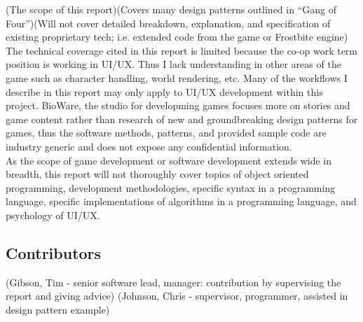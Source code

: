 (The scope of this report)(Covers many design patterns outlined in ``Gang of Four'')(Will not cover detailed breakdown, explanation, and specification of existing proprietary tech; i.e. extended code from the game or Frostbite engine)\bs
\\
The technical coverage cited in this report is limited because the co-op work term position is working in UI/UX. Thus I lack understanding in other areas of the game such as character handling, world rendering, etc. Many of the workflows I describe in this report may only apply to UI/UX development within this project. BioWare, the studio for developming games focuses more on stories and game content rather than research of new and groundbreaking design patterns for games, thus the software methods, patterns, and provided sample code are industry generic and does not expose any confidential information.\bs
\\
As the scope of game development or software development extends wide in breadth, this report will not thoroughly cover topics of object oriented programming, development methodologies, specific syntax in a programming language, specific implementations of algorithms in a programming language, and psychology of UI/UX. 

\subsection*{Contributors}

(Gibson, Tim - senior software lead, manager: contribution by supervising the report and giving advice) 
(Johnson, Chris - supervisor, programmer, assisted in design pattern example)

\newpage